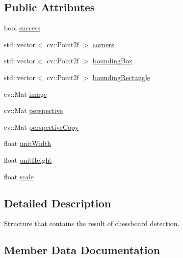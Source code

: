 \subsection*{Public Attributes}
\begin{DoxyCompactItemize}
\item 
bool \hyperlink{struct_chessboard_detector_result_a7f5e6c90f4d7b3c948d1e1ddab933df9}{success}
\item 
std\+::vector$<$ cv\+::\+Point2f $>$ \hyperlink{struct_chessboard_detector_result_a69a0fd183e694c1fb80bbad1ed2d6833}{corners}
\item 
std\+::vector$<$ cv\+::\+Point2f $>$ \hyperlink{struct_chessboard_detector_result_a6887aab98e7283ccfa4a51f8714d5260}{bounding\+Box}
\item 
std\+::vector$<$ cv\+::\+Point2f $>$ \hyperlink{struct_chessboard_detector_result_a1c1c71bb678c2eb872d9f8c4ae0a9871}{bounding\+Rectangle}
\item 
cv\+::\+Mat \hyperlink{struct_chessboard_detector_result_a9cb87f19e643fa012305b5575720332a}{image}
\item 
cv\+::\+Mat \hyperlink{struct_chessboard_detector_result_ae36efe72eb31949739d7ce8905ed2f41}{perspective}
\item 
cv\+::\+Mat \hyperlink{struct_chessboard_detector_result_a984f12b2b22c6a34a8147aa7d3d3eff0}{perspective\+Copy}
\item 
float \hyperlink{struct_chessboard_detector_result_a967889233f9ea3e34e7b215041105801}{unit\+Width}
\item 
float \hyperlink{struct_chessboard_detector_result_a95e32f26ef920afcc1e64af548120285}{unit\+Height}
\item 
float \hyperlink{struct_chessboard_detector_result_abf6c377b55ae8db5b653cb581b0baf30}{scale}
\end{DoxyCompactItemize}


\subsection{Detailed Description}
Structure that contains the result of chessboard detection. 

\subsection{Member Data Documentation}
\mbox{\label{struct_chessboard_detector_result_a6887aab98e7283ccfa4a51f8714d5260}} 
